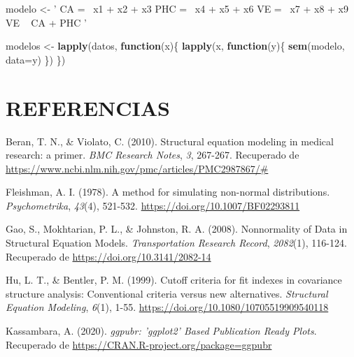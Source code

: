 \documentclass[
]{article}
\newenvironment{Shaded}{\begin{snugshade}}{\end{snugshade}}
\newcommand{\ControlFlowTok}[1]{\textcolor[rgb]{0.13,0.29,0.53}{\textbf{#1}}}
\newcommand{\DataTypeTok}[1]{\textcolor[rgb]{0.13,0.29,0.53}{#1}}
\newcommand{\KeywordTok}[1]{\textcolor[rgb]{0.13,0.29,0.53}{\textbf{#1}}}
\newcommand{\NormalTok}[1]{#1}
\newcommand{\StringTok}[1]{\textcolor[rgb]{0.31,0.60,0.02}{#1}}
\begin{document}
\label{modelos_sem}

\begin{Shaded}
\begin{Highlighting}[]
\NormalTok{modelo <-}\StringTok{ ' CA =~ x1 + x2 + x3}
\StringTok{            PHC =~ x4 + x5 + x6}
\StringTok{            VE =~ x7 + x8 + x9}
\StringTok{            VE ~ CA + PHC '}

\NormalTok{modelos <-}\StringTok{ }\KeywordTok{lapply}\NormalTok{(datos, }\ControlFlowTok{function}\NormalTok{(x)\{}
  \KeywordTok{lapply}\NormalTok{(x, }\ControlFlowTok{function}\NormalTok{(y)\{}
    \KeywordTok{sem}\NormalTok{(modelo, }\DataTypeTok{data=}\NormalTok{y)}
\NormalTok{  \})}
\NormalTok{\})}
\end{Highlighting}
\end{Shaded}

\section{REFERENCIAS}

\hypertarget{refs}{}
\leavevmode\hypertarget{ref-Beran2010StructuralEM}{}%
Beran, T. N., \& Violato, C. (2010). Structural equation modeling in
medical research: a primer. \emph{BMC Research Notes}, \emph{3},
267-267. Recuperado de
\url{https://www.ncbi.nlm.nih.gov/pmc/articles/PMC2987867/\#}

\leavevmode\hypertarget{ref-Fleishman1978}{}%
Fleishman, A. I. (1978). A method for simulating non-normal
distributions. \emph{Psychometrika}, \emph{43}(4), 521-532.
\url{https://doi.org/10.1007/BF02293811}

\leavevmode\hypertarget{ref-gao}{}%
Gao, S., Mokhtarian, P. L., \& Johnston, R. A. (2008). Nonnormality of
Data in Structural Equation Models. \emph{Transportation Research
Record}, \emph{2082}(1), 116-124. Recuperado de
\href{\%20https://doi.org/10.3141/2082-14}{https://doi.org/10.3141/2082-14}

\leavevmode\hypertarget{ref-Hu1999}{}%
Hu, L. T., \& Bentler, P. M. (1999). Cutoff criteria for fit indexes in
covariance structure analysis: Conventional criteria versus new
alternatives. \emph{Structural Equation Modeling}, \emph{6}(1), 1-55.
\url{https://doi.org/10.1080/10705519909540118}

\leavevmode\hypertarget{ref-ggpubr}{}%
Kassambara, A. (2020). \emph{ggpubr: 'ggplot2' Based Publication Ready
Plots}. Recuperado de \url{https://CRAN.R-project.org/package=ggpubr}
\end{document}
